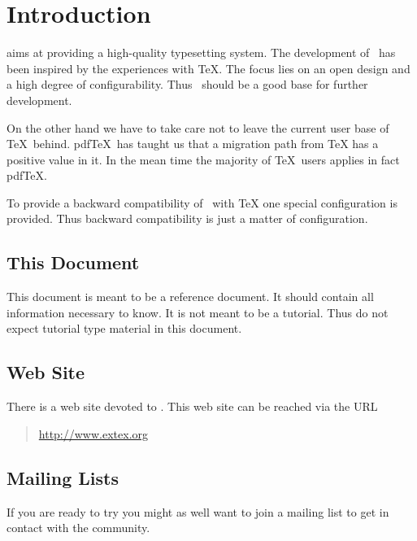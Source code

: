 \documentclass{extex-doc}
\begin{document}
\tableofcontents

\chapter{Introduction}

\ExTeX{} aims at providing a high-quality typesetting system. The
development of \ExTeX\ has been inspired by the experiences with \TeX.
The focus lies on an open design and a high degree of configurability.
Thus \ExTeX\ should be a good base for further development.

On the other hand we have to take care not to leave the current user
base of \TeX\ behind. pdf\TeX\ has taught us that a migration path
from \TeX{} has a positive value in it. In the mean time
the majority of \TeX\ users applies in fact
pdf\TeX{}.

To provide a backward compatibility of \ExTeX\ with
\TeX{} one special configuration is provided. Thus
backward compatibility is just a matter of configuration.


\section{This Document}

This document is meant to be a reference document. It should contain
all information necessary to know. It is not meant to be a tutorial.
Thus do not expect tutorial type material in this document.


\section{Web Site}

There is a web site devoted to \ExTeX. This
web site can be reached via the URL

\begin{quotation}
  \url{http://www.extex.org}
\end{quotation}


\section{Mailing Lists}

If you are ready to try \ExTeX{} you might as well want to join a
mailing list to get in contact with the community.
\end{document}
